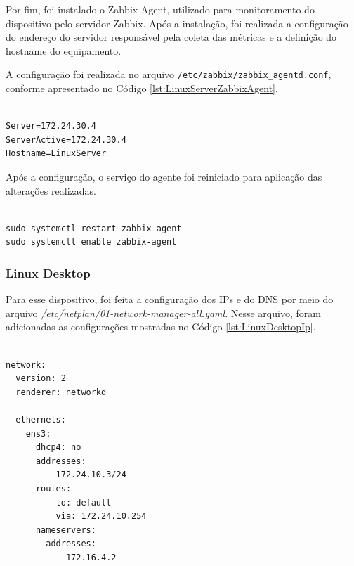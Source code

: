 Por fim, foi instalado o Zabbix Agent, utilizado para monitoramento do dispositivo pelo servidor Zabbix. Após a instalação, foi realizada a configuração do endereço do servidor responsável pela coleta das métricas e a definição do hostname do equipamento.

A configuração foi realizada no arquivo \texttt{/etc/zabbix/zabbix\_agentd.conf}, conforme apresentado no Código \ref{lst:LinuxServerZabbixAgent}.

\begin{listing}[H]
\centering
\begin{verbatim}

Server=172.24.30.4
ServerActive=172.24.30.4
Hostname=LinuxServer

\end{verbatim}
\caption{Configuração do Zabbix Agent - Linux Server}
\label{lst:LinuxServerZabbixAgent}
\end{listing}

Após a configuração, o serviço do agente foi reiniciado para aplicação das alterações realizadas.

\begin{listing}[H]
\centering
\begin{verbatim}

sudo systemctl restart zabbix-agent
sudo systemctl enable zabbix-agent

\end{verbatim}
\caption{Inicialização do serviço Zabbix Agent}
\label{lst:LinuxServerZabbixRestart}
\end{listing}

\subsubsection{Linux Desktop}
Para esse dispositivo, foi feita a configuração dos IPs e do DNS por meio do arquivo \textit{/etc/netplan/01-network-manager-all.yaml}. Nesse arquivo, foram adicionadas as configurações mostradas no Código \ref{lst:LinuxDesktopIp}.

\begin{listing}[H]
\centering
\begin{verbatim}

network:
  version: 2
  renderer: networkd

  ethernets:
    ens3:
      dhcp4: no
      addresses:
        - 172.24.10.3/24
      routes:
        - to: default
          via: 172.24.10.254
      nameservers:
        addresses:
          - 172.16.4.2

\end{verbatim}
\caption{Configuração do IP - Linux Desktop}
\label{lst:LinuxDesktopIp}
\end{listing}

